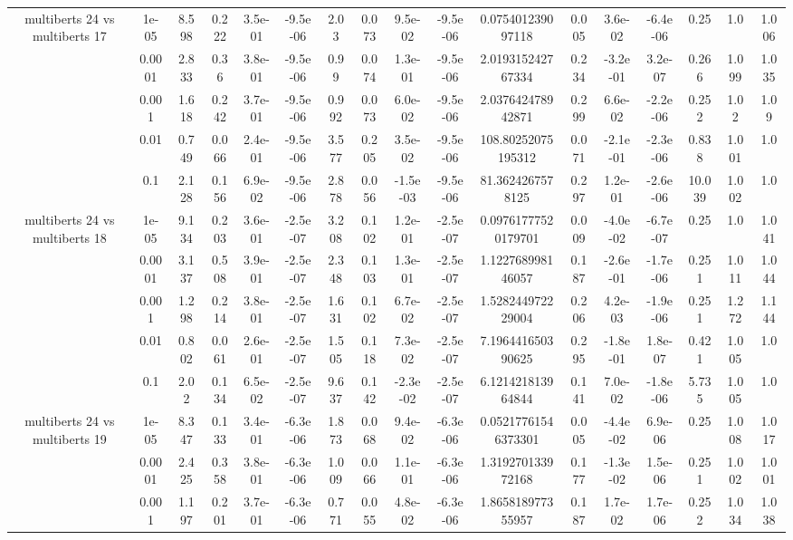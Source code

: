 \begin{tabular}{|c|c|c|c|c|c|c|c|c|c|c|c|c|c|c|c|c|}
\hline
\multirow{5}{*}{multiberts 24 vs multiberts 17} & 1e-05 & 8.598 & 0.222 & 3.5e-01 & -9.5e-06 & 2.03 & 0.073 & 9.5e-02 & -9.5e-06 & 0.075401239097118 & 0.005 & 3.6e-02 & -6.4e-06 & 0.25 & 1.0 & 1.006 \\
 & 0.0001 & 2.833 & 0.36 & 3.8e-01 & -9.5e-06 & 0.99 & 0.074 & 1.3e-01 & -9.5e-06 & 2.019315242767334 & 0.234 & -3.2e-01 & 3.2e-07 & 0.266 & 1.099 & 1.035 \\
 & 0.001 & 1.618 & 0.242 & 3.7e-01 & -9.5e-06 & 0.992 & 0.073 & 6.0e-02 & -9.5e-06 & 2.037642478942871 & 0.299 & 6.6e-02 & -2.2e-06 & 0.252 & 1.02 & 1.09 \\
 & 0.01 & 0.749 & 0.066 & 2.4e-01 & -9.5e-06 & 3.577 & 0.205 & 3.5e-02 & -9.5e-06 & 108.80252075195312 & 0.071 & -2.1e-01 & -2.3e-06 & 0.838 & 1.001 & 1.0 \\
 & 0.1 & 2.128 & 0.156 & 6.9e-02 & -9.5e-06 & 2.878 & 0.056 & -1.5e-03 & -9.5e-06 & 81.3624267578125 & 0.297 & 1.2e-01 & -2.6e-06 & 10.039 & 1.002 & 1.0 \\
\hline
\multirow{5}{*}{multiberts 24 vs multiberts 18} & 1e-05 & 9.134 & 0.203 & 3.6e-01 & -2.5e-07 & 3.208 & 0.102 & 1.2e-01 & -2.5e-07 & 0.09761777520179701 & 0.009 & -4.0e-02 & -6.7e-07 & 0.25 & 1.0 & 1.041 \\
 & 0.0001 & 3.137 & 0.508 & 3.9e-01 & -2.5e-07 & 2.348 & 0.103 & 1.3e-01 & -2.5e-07 & 1.122768998146057 & 0.187 & -2.6e-01 & -1.7e-06 & 0.251 & 1.011 & 1.044 \\
 & 0.001 & 1.298 & 0.214 & 3.8e-01 & -2.5e-07 & 1.631 & 0.102 & 6.7e-02 & -2.5e-07 & 1.528244972229004 & 0.206 & 4.2e-03 & -1.9e-06 & 0.251 & 1.272 & 1.144 \\
 & 0.01 & 0.802 & 0.061 & 2.6e-01 & -2.5e-07 & 1.505 & 0.118 & 7.3e-02 & -2.5e-07 & 7.196441650390625 & 0.295 & -1.8e-01 & 1.8e-07 & 0.421 & 1.005 & 1.0 \\
 & 0.1 & 2.02 & 0.134 & 6.5e-02 & -2.5e-07 & 9.637 & 0.142 & -2.3e-02 & -2.5e-07 & 6.121421813964844 & 0.141 & 7.0e-02 & -1.8e-06 & 5.735 & 1.005 & 1.0 \\
\hline
\multirow{5}{*}{multiberts 24 vs multiberts 19} & 1e-05 & 8.347 & 0.133 & 3.4e-01 & -6.3e-06 & 1.873 & 0.068 & 9.4e-02 & -6.3e-06 & 0.05217761546373301 & 0.005 & -4.4e-02 & 6.9e-06 & 0.25 & 1.008 & 1.017 \\
 & 0.0001 & 2.425 & 0.358 & 3.8e-01 & -6.3e-06 & 1.009 & 0.066 & 1.1e-01 & -6.3e-06 & 1.319270133972168 & 0.177 & -1.3e-02 & 1.5e-06 & 0.251 & 1.002 & 1.001 \\
 & 0.001 & 1.197 & 0.201 & 3.7e-01 & -6.3e-06 & 0.771 & 0.055 & 4.8e-02 & -6.3e-06 & 1.865818977355957 & 0.187 & 1.7e-02 & 1.7e-06 & 0.252 & 1.034 & 1.038 \\

\end{tabular}

